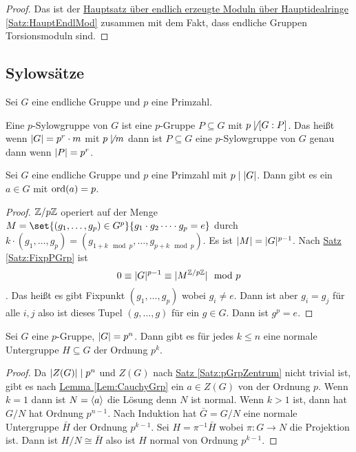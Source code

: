 \begin{proof}
    Das ist der \hyperref[Satz:HauptEndlMod]{Hauptsatz über endlich erzeugte Moduln über Hauptidealringe} \ref{Satz:HauptEndlMod} zusammen mit dem Fakt, dass endliche Gruppen Torsionsmoduln sind.
\end{proof}
\subsection{Sylowsätze}
Sei \(G\) eine endliche Gruppe und \(p\) eine Primzahl.
\begin{Def}
    Eine \(p\)-Sylowgruppe von \(G\) ist eine \(p\)-Gruppe \(P\subseteq G\) mit \(p\not\mid[G:P]\). Das heißt wenn \(\lvert G\rvert=p^r\cdot m\) mit \(p\not\mid m\) dann ist \(P\subseteq G\) eine \(p\)-Sylowgruppe von \(G\) genau dann wenn \(\lvert P\rvert=p^r\).
\end{Def}
\begin{Lemma}\label{Lem:CauchyGrp}
    Sei \(G\) eine endliche Gruppe und \(p\) eine Primzahl mit \(p\mid \lvert G\rvert\). Dann gibt es ein \(a\in G\) mit \(\operatorname{ord}(a)=p\).
\end{Lemma}
\begin{proof}
    \(\mathbb{Z}/p\mathbb{Z}\) operiert auf der Menge \(M=\set{(g_1,\dots,g_p)\in G^p}{g_1\cdot g_2\dots \cdot g_p=e}\) durch \(k\cdot (g_1,\dots,g_p)=(g_{1+k\mod p},\dots,g_{p+k\mod p})\). Es ist \(\lvert M\rvert=\lvert G\rvert ^{p-1}\).
    Nach \hyperref[Satz:FixpPGrp]{ Satz \ref{Satz:FixpPGrp}} ist \[0\equiv \lvert G\rvert^{p-1}\equiv \lvert M^{\mathbb{Z}/p\mathbb{Z}}\rvert\mod p\]. Das heißt es gibt Fixpunkt \((g_1,\dots,g_p)\) wobei \(g_i\neq e\).
    Dann ist aber \(g_i=g_j\) für alle \(i,j\) also ist dieses Tupel \((g,\dots ,g)\) für ein \(g\in G\). Dann ist \(g^p=e\).
\end{proof}
\begin{Kor}\label{Kor:NormIndex}
    Sei \(G\) eine \(p\)-Gruppe, \(\lvert G\rvert=p^n\). Dann gibt es für jedes \(k\leq n\) eine normale Untergruppe \(H\subseteq G\) der Ordnung \(p^k\).
\end{Kor}
\begin{proof}
    Da \(\lvert Z(G)\rvert\mid p^n\) und \(Z(G)\) nach \hyperref[Satz:pGrpZentrum]{Satz \ref{Satz:pGrpZentrum}} nicht trivial ist, gibt es nach \hyperref[Lem:CauchyGrp]{Lemma \ref{Lem:CauchyGrp}} ein \(a\in Z(G)\) von der Ordnung \(p\). Wenn \(k=1\) dann ist \(N=\langle a\rangle\) die Lösung denn \(N\) ist normal. Wenn \(k>1\) ist, dann hat \(G/N\) hat Ordnung \(p^{n-1}\). Nach Induktion hat \(\bar G=G/N\) eine normale Untergruppe \(\bar H\) der Ordnung \(p^{k-1}\). Sei \(H=\pi^{-1}\bar H\) wobei \(\pi\colon G\to N\) die Projektion ist. Dann ist \(H/N\cong \bar H\) also ist \(H\) normal von Ordnung \(p^{k-1}\).
\end{proof}
